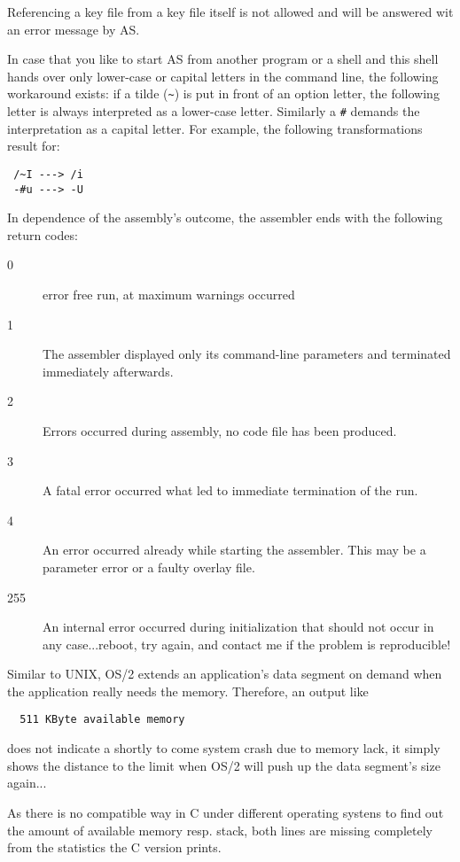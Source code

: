 \documentclass[12pt,twoside]{report}
\newcommand{\tty}[1]{{\tt #1}}
\begin{document}
Referencing a key file from a key file itself is not allowed and will be
answered wit an error message by AS.

In case that you like to start AS from another program or a shell and
this shell hands over only lower-case or capital letters in the
command line, the following workaround exists: if a tilde (\verb!~!) is put
in front of an option letter, the following letter is always
interpreted as a lower-case letter.  Similarly a \tty{\#} demands the
interpretation as a capital letter.  For example, the following
transformations result for:
\begin{verbatim}
 /~I ---> /i
 -#u ---> -U
\end{verbatim}
In dependence of the assembly's outcome, the assembler ends with
the following return codes:
\begin{description}
\item[0]{error free run, at maximum warnings occurred}
\item[1]{The assembler displayed only its command-line parameters and
         terminated immediately afterwards.}
\item[2]{Errors occurred during assembly, no code file has been produced.}
\item[3]{A fatal error occurred what led to immediate termination of the run.}
\item[4]{An error occurred already while starting the assembler.
         This may be a parameter error or a faulty overlay file.}
\item[255]{An internal error occurred during initialization that should not
         occur in any case...reboot, try again, and contact me if the
         problem is reproducible!}
\end{description}
Similar to UNIX, OS/2  extends an application's data
segment on demand when the application really needs the memory.
Therefore, an output like
\begin{verbatim}
  511 KByte available memory
\end{verbatim}
does not indicate a shortly to come system crash due to memory lack,
it simply shows the distance to the limit when OS/2 will push up the
data segment's size again...

As there is no compatible way in C  under different
operating systens to find out the amount of available memory resp. stack,
both lines are missing completely from the statistics the C version prints.

\end{document}

